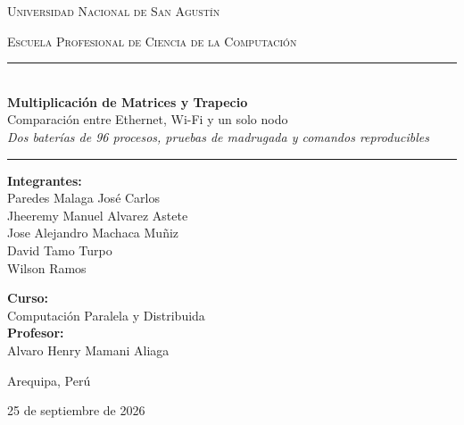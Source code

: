 \documentclass[11pt,a4paper]{article}
\begin{document}
\begin{titlepage}
    \centering
    \vspace*{1.5cm}
    {\scshape\LARGE Universidad Nacional de San Agustín \par}
    \vspace{0.3cm}
    {\scshape\large Escuela Profesional de Ciencia de la Computación \par}

    \vspace{2.5cm}
    \rule{\linewidth}{0.5mm}\\[0.4cm]
    {\huge\bfseries Multiplicación de Matrices y Trapecio}\\[0.3cm]
    {\large Comparación entre Ethernet, Wi-Fi y un solo nodo}\\[0.25cm]
    {\normalsize\itshape Dos baterías de 96 procesos, pruebas de madrugada y comandos reproducibles}\\[0.4cm]
    \rule{\linewidth}{0.5mm}

    \vspace{3cm}
    \begin{minipage}[t]{0.5\textwidth}
        \textbf{Integrantes:}\\
        Paredes Malaga José Carlos\\
        Jheeremy Manuel Alvarez Astete\\
        Jose Alejandro Machaca Muñiz\\
        David Tamo Turpo\\
        Wilson Ramos
    \end{minipage}
    \hfill
    \begin{minipage}[t]{0.42\textwidth}
        \raggedleft
        \textbf{Curso:}\\
        Computación Paralela y Distribuida\\[0.2cm]
        \textbf{Profesor:}\\
        Alvaro Henry Mamani Aliaga
    \end{minipage}

    \vfill
    {\large Arequipa, Perú\par}
    {\large 25 de septiembre de 2026\par}
\end{titlepage}
\setcounter{tocdepth}{1}
\tableofcontents
\clearpage
{}

\clearpage
\appendix

\end{document}
